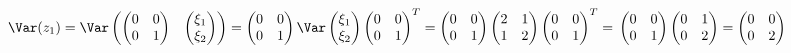 \documentclass[pdftex,11pt,openany]{book}\usepackage[]{graphicx}\usepackage[]{color}
\begin{document}
\begin{solution}
$\Var (z_1) = \Var   \begin{pmatrix}
 \begin{pmatrix}
0 & 0 \\
0 & 1 \\
\end{pmatrix}  &  \begin{pmatrix}
\xi_1 \\
\xi_2 \\
\end{pmatrix}  \\
\end{pmatrix}  =  \begin{pmatrix}
0 & 0 \\
0 & 1 \\
\end{pmatrix}  \Var   \begin{pmatrix}
\xi_1 \\
\xi_2 \\
\end{pmatrix}   \begin{pmatrix}
0 & 0 \\
0 & 1 \\
\end{pmatrix} ^T =  \begin{pmatrix}
0 & 0 \\
0 & 1 \\
\end{pmatrix}   \begin{pmatrix}
2 & 1 \\
1 & 2 \\
\end{pmatrix}   \begin{pmatrix}
0 & 0 \\
0 & 1 \\
\end{pmatrix} ^T = \\
\begin{pmatrix}
0 & 0 \\
0 & 1 \\
\end{pmatrix}   \begin{pmatrix}
0 & 1 \\
0 & 2 \\
\end{pmatrix}  =  \begin{pmatrix}
0 & 0 \\
0 & 2 \\
\end{pmatrix} $
\end{solution}
\end{document}
